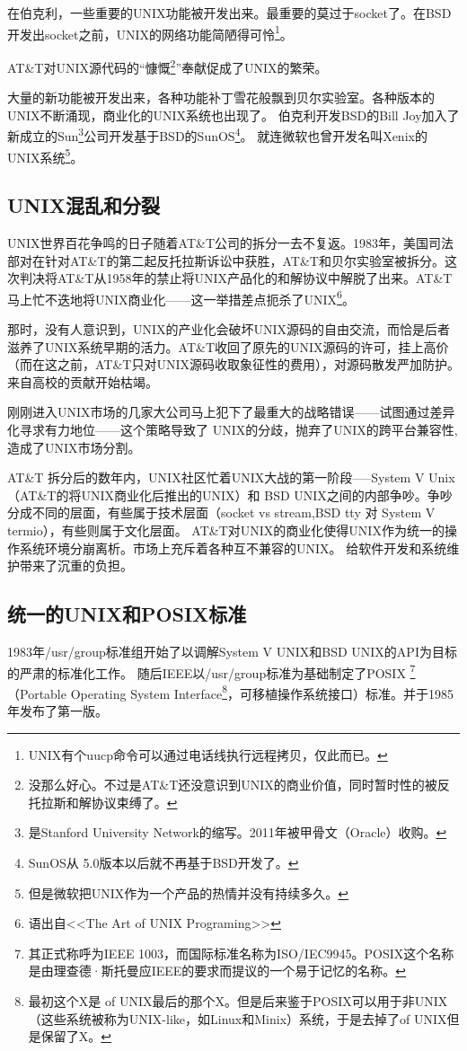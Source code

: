 在伯克利，一些重要的UNIX功能被开发出来。最重要的莫过于socket了。在BSD开发出socket之前，UNIX的网络功能简陋得可怜\footnote{UNIX有个uucp命令可以通过电话线执行远程拷贝，仅此而已。}。


AT\&T对UNIX源代码的“慷慨\footnote{没那么好心。不过是AT\&T还没意识到UNIX的商业价值，同时暂时性的被反托拉斯和解协议束缚了。}”奉献促成了UNIX的繁荣。

大量的新功能被开发出来，各种功能补丁雪花般飘到贝尔实验室。各种版本的UNIX不断涌现，商业化的UNIX系统也出现了。
伯克利开发BSD的Bill Joy加入了新成立的Sun\footnote{是Stanford University Network的缩写。2011年被甲骨文（Oracle）收购。}公司开发基于BSD的SunOS\footnote{SunOS从 5.0版本以后就不再基于BSD开发了。}。
就连微软也曾开发名叫Xenix的UNIX系统\footnote{但是微软把UNIX作为一个产品的热情并没有持续多久。}。


\subsection{UNIX混乱和分裂}

UNIX世界百花争鸣的日子随着AT\&T公司的拆分一去不复返。1983年，美国司法部对在针对AT\&T的第二起反托拉斯诉讼中获胜，AT\&T和贝尔实验室被拆分。这次判决将AT\&T从1958年的禁止将UNIX产品化的和解协议中解脱了出来。AT\&T马上忙不迭地将UNIX商业化------这一举措差点扼杀了UNIX\footnote{语出自<<The Art of UNIX Programing>>}。

那时，没有人意识到，UNIX的产业化会破坏UNIX源码的自由交流，而恰是后者滋养了UNIX系统早期的活力。AT\&T收回了原先的UNIX源码的许可，挂上高价（而在这之前，AT\&T只对UNIX源码收取象征性的费用），对源码散发严加防护。来自高校的贡献开始枯竭。

刚刚进入UNIX市场的几家大公司马上犯下了最重大的战略错误------试图通过差异化寻求有力地位------这个策略导致了
UNIX的分歧，抛弃了UNIX的跨平台兼容性,造成了UNIX市场分割。

AT\&T 拆分后的数年内，UNIX社区忙着UNIX大战的第一阶段-----System V Unix（AT\&T的将UNIX商业化后推出的UNIX）和 BSD UNIX之间的内部争吵。争吵分成不同的层面，有些属于技术层面（socket vs stream,BSD tty 对 System V termio），有些则属于文化层面。
AT\&T对UNIX的商业化使得UNIX作为统一的操作系统环境分崩离析。市场上充斥着各种互不兼容的UNIX。
给软件开发和系统维护带来了沉重的负担。

\subsection{统一的UNIX和POSIX标准}

1983年/usr/group标准组开始了以调解System V UNIX和BSD UNIX的API为目标的严肃的标准化工作。
随后IEEE以/usr/group标准为基础制定了POSIX
\footnote{其正式称呼为IEEE 1003，而国际标准名称为ISO/IEC9945。POSIX这个名称是由理查德·斯托曼应IEEE的要求而提议的一个易于记忆的名称。}
（Portable Operating System Interface\footnote{最初这个X是 of UNIX最后的那个X。但是后来鉴于POSIX可以用于非UNIX（这些系统被称为UNIX-like，如Linux和Minix）系统，于是去掉了of UNIX但是保留了X。 }，可移植操作系统接口）标准。并于1985年发布了第一版。

